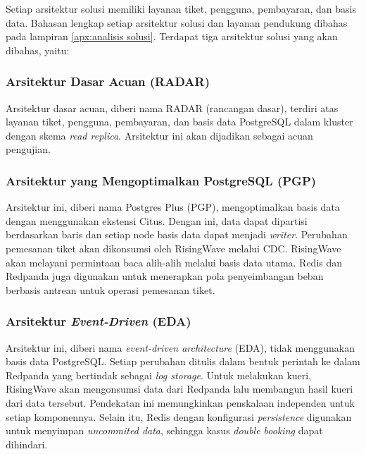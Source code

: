 Setiap arsitektur solusi memiliki layanan tiket, pengguna, pembayaran, dan basis data. Bahasan lengkap setiap arsitektur solusi dan layanan pendukung dibahas pada lampiran \ref{apx:analisis solusi}. Terdapat tiga arsitektur solusi yang akan dibahas, yaitu:

\subsubsection{Arsitektur Dasar Acuan (RADAR)}

Arsitektur dasar acuan, diberi nama RADAR (rancangan dasar), terdiri atas layanan tiket, pengguna, pembayaran, dan basis data PostgreSQL dalam kluster dengan skema \textit{read replica}. Arsitektur ini akan dijadikan sebagai acuan pengujian.

\subsubsection{Arsitektur yang Mengoptimalkan PostgreSQL (PGP)}

Arsitektur ini, diberi nama Postgres Plus (PGP), mengoptimalkan basis data dengan menggunakan ekstensi Citus. Dengan ini, data dapat dipartisi berdasarkan baris dan setiap node basis data dapat menjadi \textit{writer}. Perubahan pemesanan tiket akan dikonsumsi oleh RisingWave melalui CDC. RisingWave akan melayani permintaan baca alih-alih melalui basis data utama. Redis dan Redpanda juga digunakan untuk menerapkan pola penyeimbangan beban berbasis antrean untuk operasi pemesanan tiket.

\subsubsection{Arsitektur \textit{Event-Driven} (EDA)}

Arsitektur ini, diberi nama \textit{event-driven architecture} (EDA), tidak menggunakan basis data PostgreSQL. Setiap perubahan ditulis dalam bentuk perintah ke dalam Redpanda yang bertindak sebagai \textit{log storage}. Untuk melakukan kueri, RisingWave akan mengonsumsi data dari Redpanda lalu membangun hasil kueri dari data tersebut. Pendekatan ini memungkinkan penskalaan independen untuk setiap komponennya. Selain itu, Redis dengan konfigurasi \textit{persistence} digunakan untuk menyimpan \textit{uncommited data}, sehingga kasus \textit{double booking} dapat dihindari.